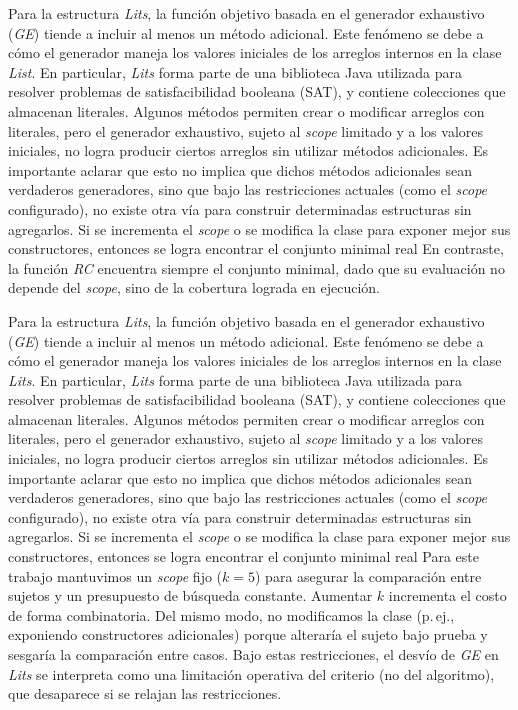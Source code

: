 Para la estructura \emph{Lits}, la función objetivo basada en el generador exhaustivo (\emph{GE}) tiende a incluir al menos un 
método adicional. Este fenómeno se debe a cómo el generador maneja los valores iniciales de los arreglos internos en la clase 
\emph{List}. En particular, \emph{Lits} forma parte de una biblioteca Java utilizada para resolver problemas de satisfacibilidad 
booleana (SAT), y contiene colecciones que almacenan literales. Algunos métodos permiten crear o modificar arreglos con literales, 
pero el generador exhaustivo, sujeto al \emph{scope} limitado y a los valores iniciales, no logra producir ciertos arreglos sin 
utilizar métodos adicionales. Es importante aclarar que esto no implica que dichos métodos adicionales sean verdaderos generadores, 
sino que bajo las restricciones actuales (como el \emph{scope} configurado), no existe otra vía para construir determinadas 
estructuras sin agregarlos. Si se incrementa el \emph{scope} o se modifica la clase para exponer mejor sus constructores, entonces 
se logra encontrar el conjunto minimal real  En contraste, la función \emph{RC} encuentra siempre el conjunto minimal, dado que su 
evaluación no depende del \emph{scope}, sino de la cobertura lograda en ejecución.


Para la estructura \emph{Lits}, la función objetivo basada en el generador
exhaustivo (\emph{GE}) tiende a incluir al menos un método adicional. Este
fenómeno se debe a cómo el generador maneja los valores iniciales de los
arreglos internos en la clase \emph{Lits}. En particular, \emph{Lits} forma
parte de una biblioteca Java utilizada para resolver problemas de
satisfacibilidad booleana (SAT), y contiene colecciones que almacenan
literales. Algunos métodos permiten crear o modificar arreglos con literales,
pero el generador exhaustivo, sujeto al \emph{scope} limitado y a los valores
iniciales, no logra producir ciertos arreglos sin utilizar métodos adicionales.
Es importante aclarar que esto no implica que dichos métodos adicionales sean
verdaderos generadores, sino que bajo las restricciones actuales (como el
\emph{scope} configurado), no existe otra vía para construir determinadas
estructuras sin agregarlos. Si se incrementa el \emph{scope} o se modifica la
clase para exponer mejor sus constructores, entonces se logra encontrar el
conjunto minimal real  
Para este trabajo mantuvimos un \emph{scope} fijo (\(k=5\)) para asegurar
la comparación entre sujetos y un presupuesto de búsqueda
constante. Aumentar \(k\) incrementa el costo de forma combinatoria. Del mismo
modo, no modificamos la clase (p.\,ej., exponiendo constructores adicionales)
porque alteraría el sujeto bajo prueba y sesgaría la comparación entre casos.
Bajo estas restricciones, el desvío de \emph{GE} en \emph{Lits} se interpreta
como una limitación operativa del criterio (no del algoritmo), que desaparece
si se relajan las restricciones.

